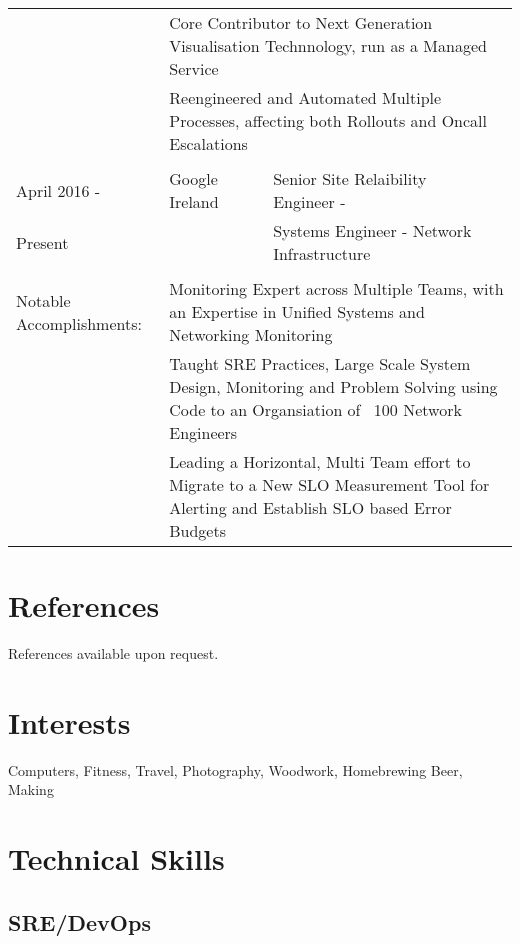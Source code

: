 \documentclass[a4paper, 11pt] {article}
\begin{document}
\begin{tabular}{llll}
			 & \multicolumn{3}{l}{Core Contributor to Next Generation Visualisation Technnology, run as a Managed Service} \\
			 & \multicolumn{3}{l}{Reengineered and Automated Multiple Processes, affecting both Rollouts and Oncall Escalations} \\
		& 				&					 	  &			\\
April 2016 -	&	Google Ireland		&  Senior Site Relaibility Engineer -		  &	\hspace{10mm}	\\
Present		&				&  Systems Engineer - Network Infrastructure      &            		\\
      		&				&              					  &            		\\
Notable Accomplishments: & \multicolumn{3}{l}{Monitoring Expert across Multiple Teams, with an Expertise in Unified Systems and Networking Monitoring} \\
			 & \multicolumn{3}{l}{Taught SRE Practices, Large Scale System Design, Monitoring and Problem Solving using Code to an Organsiation of ~100 Network Engineers} \\
			 & \multicolumn{3}{l}{Leading a Horizontal, Multi Team effort to Migrate to a New SLO Measurement Tool for Alerting and Establish SLO based Error Budgets} \\
			 
\end{tabular}

\section*{References}

References available upon request.

\section*{Interests}

Computers, Fitness, Travel, Photography, Woodwork, Homebrewing Beer, Making

\section*{Technical Skills}

\subsection*{SRE/DevOps}
\end{document}
